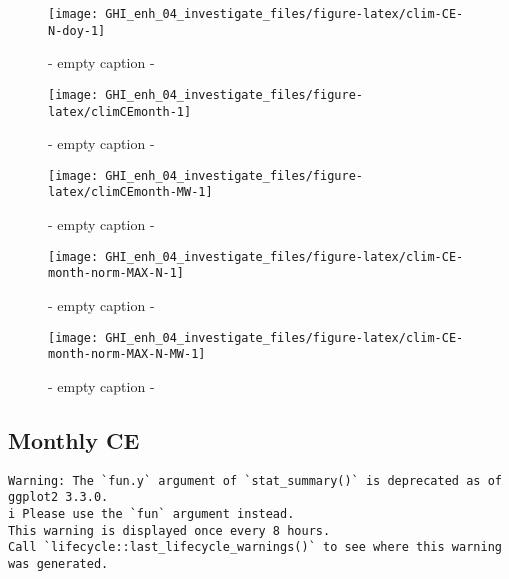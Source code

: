 \documentclass[
  10pt,
  a4paper,oneside]{article}
\begin{document}
\begin{figure}[H]

{\centering \texttt{[image: GHI\_enh\_04\_investigate\_files/figure-latex/clim-CE-N-doy-1]} 

}

\caption{ - empty caption - }\label{fig:clim-CE-N-doy}
\end{figure}
\begin{figure}[H]

{\centering \texttt{[image: GHI\_enh\_04\_investigate\_files/figure-latex/climCEmonth-1]} 

}

\caption{ - empty caption - }\label{fig:climCEmonth}
\end{figure}
\begin{figure}[H]

{\centering \texttt{[image: GHI\_enh\_04\_investigate\_files/figure-latex/climCEmonth-MW-1]} 

}

\caption{ - empty caption - }\label{fig:climCEmonth-MW}
\end{figure}
\begin{figure}[H]

{\centering \texttt{[image: GHI\_enh\_04\_investigate\_files/figure-latex/clim-CE-month-norm-MAX-N-1]} 

}

\caption{ - empty caption - }\label{fig:clim-CE-month-norm-MAX-N}
\end{figure}
\begin{figure}[H]

{\centering \texttt{[image: GHI\_enh\_04\_investigate\_files/figure-latex/clim-CE-month-norm-MAX-N-MW-1]} 

}

\caption{ - empty caption - }\label{fig:clim-CE-month-norm-MAX-N-MW}
\end{figure}

\hypertarget{monthly-ce}{%
\subsection{Monthly CE}\label{monthly-ce}}

\begin{verbatim}
Warning: The `fun.y` argument of `stat_summary()` is deprecated as of ggplot2 3.3.0.
i Please use the `fun` argument instead.
This warning is displayed once every 8 hours.
Call `lifecycle::last_lifecycle_warnings()` to see where this warning was generated.
\end{verbatim}
\end{document}
